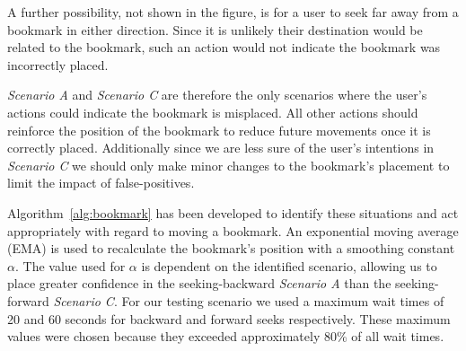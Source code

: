 \documentclass[a4paper,11pt]{article}
\begin{document}
A further possibility, not shown in the figure, is for a user to seek far away from a bookmark in either direction. Since it is unlikely their destination would be related to the bookmark, such an action would not indicate the bookmark was incorrectly placed.

\emph{Scenario A} and \emph{Scenario C} are therefore the only scenarios where the user's actions could indicate the bookmark is misplaced. All other actions should reinforce the position of the bookmark to reduce future movements once it is correctly placed. Additionally since we are less sure of the user's intentions in \emph{Scenario C} we should only make minor changes to the bookmark's placement to limit the impact of false-positives.

Algorithm~\ref{alg:bookmark} has been developed to identify these situations and act appropriately with regard to moving a bookmark. An exponential moving average (EMA) is used to recalculate the bookmark's position with a smoothing constant $\alpha$. The value used for $\alpha$ is dependent on the identified scenario, allowing us to place greater confidence in the seeking-backward \emph{Scenario A} than the seeking-forward \emph{Scenario C}. For our testing scenario we used a maximum wait times of 20 and 60 seconds for backward and forward seeks respectively. These maximum values were chosen because they exceeded approximately 80\% of all wait times.



\end{document}
